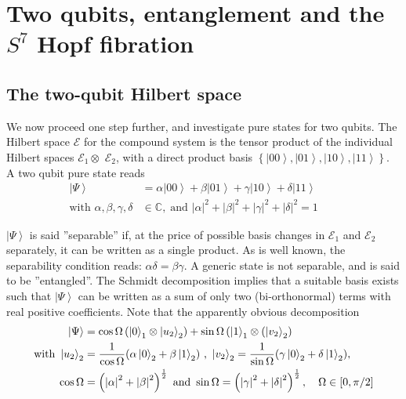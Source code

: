 \documentclass{amsart}
\begin{document}
\section{Two qubits, entanglement and the $S^{7}$ Hopf fibration}

\subsection{The two-qubit Hilbert space}

We now proceed one step further, and investigate pure states for two qubits.
The Hilbert space $\mathcal{E}$ for the compound system is the tensor product
of the individual Hilbert spaces $\mathcal{E}_{1}\otimes$ $\mathcal{E}_{2}$,
with a direct product basis $\left\{  \left|  00\right\rangle ,\left|
01\right\rangle ,\left|  10\right\rangle ,\left|  11\right\rangle \right\}  $.
A two qubit pure state reads
\begin{align}
\left|  \Psi\right\rangle  &  =\alpha\left|  00\right\rangle +\beta\left|
01\right\rangle +\gamma\left|  10\right\rangle +\delta\left|  11\right\rangle
\qquad\label{two-qbit state}\\
\text{with \ }\alpha,\beta,\gamma,\delta &  \in\mathbb{C},\;\text{and }\left|
\alpha\right|  ^{2}+\left|  \beta\right|  ^{2}+\left|  \gamma\right|
^{2}+\left|  \delta\right|  ^{2}=1\nonumber
\end{align}

$\left|  \Psi\right\rangle $ is said ''separable'' if, at the price of
possible basis changes in $\mathcal{E}_{1}$ and $\mathcal{E}_{2}$ separately,
it can be written as a single product. As is well known, the separability
condition reads: $\alpha\delta=\beta\gamma$. A generic state is not separable,
and is said to be ''entangled''. The Schmidt decomposition \cite{peres}
implies that a suitable basis exists such that $\left|  \Psi\right\rangle $
can be written as a sum of only two (bi-orthonormal) terms with real positive
coefficients. Note that the apparently obvious decomposition
\begin{align}
\left|  \Psi\right\rangle  &  =\cos\Omega\left(  \left|  0\right\rangle
_{1}\otimes\left|  u_{2}\right\rangle _{2}\right)  +\sin\Omega\left(  \left|
1\right\rangle _{1}\otimes(\left|  v_{2}\right\rangle _{2}\right)  \nonumber\\
\text{with }\left|  u_{2}\right\rangle _{2} &  =\frac{1}{\cos\Omega}%
(\alpha\left|  0\right\rangle _{2}+\beta\left|  1\right\rangle _{2})\text{ ,
}\left|  v_{2}\right\rangle _{2}=\frac{1}{\sin\Omega}(\gamma\left|
0\right\rangle _{2}+\delta\left|  1\right\rangle _{2}),\\
\cos\Omega &  =\left(  \left|  \alpha\right|  ^{2}+\left|  \beta\right|
^{2}\right)  ^{%
\frac12
}\text{ and }\sin\Omega=\left(  \left|  \gamma\right|  ^{2}+\left|
\delta\right|  ^{2}\right)  ^{%
\frac12
},\quad\Omega\in\left[  0,\pi/2\right]  \nonumber
\end{align}
\end{document}
